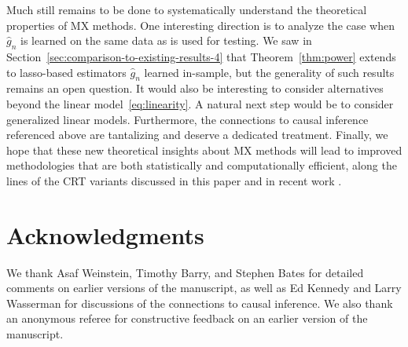 \documentclass[12pt]{article}
\theoremstyle{definition}
\theoremstyle{remark}
\newcommand{\prx}{\bm X}
\newcommand{\prz}{\bm Z}
\begin{document}
%



Much still remains to be done to systematically understand the theoretical properties of MX methods. One interesting direction is to analyze the case when $\widehat g_n$ is learned on the same data as is used for testing. We saw in Section~\ref{sec:comparison-to-existing-results-4} that Theorem~\ref{thm:power} extends to lasso-based estimators $\widehat g_n$ learned in-sample, but the generality of such results remains an open question. It would also be interesting to consider alternatives beyond the linear model~\eqref{eq:linearity}. A natural next step would be to consider generalized linear models. Furthermore, the connections to causal inference referenced above are tantalizing and deserve a dedicated treatment. Finally, we hope that these new theoretical insights about MX methods will lead to improved methodologies that are both statistically and computationally efficient, along the lines of the CRT variants discussed in this paper and in recent work \cite{Liu2020}.


\section*{Acknowledgments}
We thank Asaf Weinstein, Timothy Barry, and Stephen Bates for detailed comments on earlier versions of the manuscript, as well as Ed Kennedy and Larry Wasserman for discussions of the connections to causal inference. We also thank an anonymous referee for constructive feedback on an earlier version of the manuscript.
\end{document}
